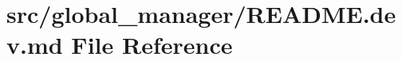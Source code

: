 \hypertarget{global__manager_2README_8dev_8md}{}\section{src/global\+\_\+manager/\+R\+E\+A\+D\+ME.dev.\+md File Reference}
\label{global__manager_2README_8dev_8md}
